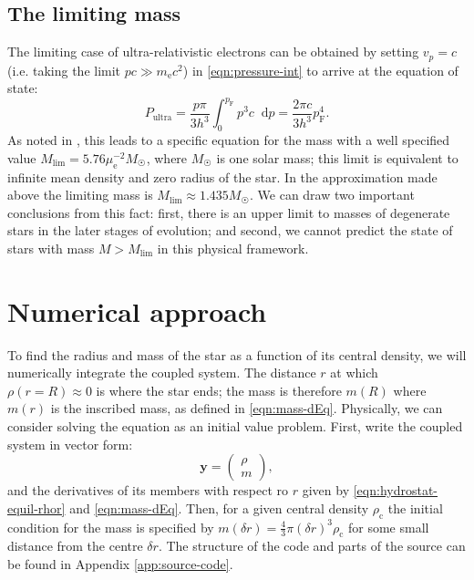 \documentclass[]{article}
\newcommand{\dd}{\mathop{}\!\mathrm{d}}
\renewcommand{\vec}[1]{\boldsymbol{#1}}
\newcommand{\rhoCentre}{\rho_\mathrm{c}}
\newcommand{\fermiMtm}{p_\mathrm{F}}
\newcommand{\massElectron}{m_\mathrm{e}}
\begin{document}
\subsection{The limiting mass}
	The limiting case of ultra-relativistic electrons can be obtained by setting $v_p = c$ (i.e. taking the limit $pc \gg \massElectron c^2$) in \eqref{eqn:pressure-int} to arrive at the equation of state:
	\begin{equation}
		P_\mathrm{ultra} = \frac{p \pi}{3 h^3} \int_0^{\fermiMtm} p^3 c \dd p = \frac{2 \pi c}{3 h^3} \fermiMtm^4.
	\end{equation}
	As noted in \cite{Chandrasekhar1984}, this leads to a specific equation for the mass with a well specified value $M_\mathrm{lim} = 5.76 \mu_{\mathrm{e}}^{-2} M_{\astrosun}$, where $M_{\astrosun}$ is one solar mass; this limit is equivalent to infinite mean density and zero radius of the star. In the approximation made above the limiting mass is $M_\mathrm{lim} \approx 1.435 M_{\astrosun}$. We can draw two important conclusions from this fact: first, there is an upper limit to masses of degenerate stars in the later stages of evolution; and second, we cannot predict the state of stars with mass $ M > M_\mathrm{lim}$ in this physical framework.

\section{Numerical approach}\label{sec:numerical-approach}
	To find the radius and mass of the star as a function of its central density, we will numerically integrate the coupled system. The distance $r$ at which $\rho (r=R) \approx 0$ is where the star ends; the mass is therefore $m(R)$ where $m(r)$ is the inscribed mass, as defined in \eqref{eqn:mass-dEq}. Physically, we can consider solving the equation as an initial value problem. First, write the coupled system in vector form:
	\begin{equation}
		\vec{y} = \begin{pmatrix}
			\rho \\
			m
		\end{pmatrix},
	\end{equation}
	and the derivatives of its members with respect ro $r$ given by \eqref{eqn:hydrostat-equil-rhor} and \eqref{eqn:mass-dEq}. Then, for a given central density $\rhoCentre$ the initial condition for the mass is specified by $m(\delta r) = \frac{4}{3} \pi (\delta r)^3 \rhoCentre$ for some small distance from the centre $\delta r$. The structure of the code and parts of the source can be found in Appendix \ref{app:source-code}.
\end{document}
